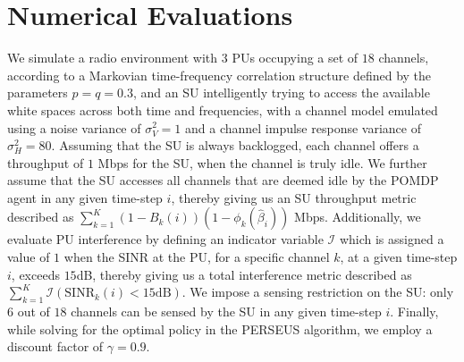 \documentclass[10pt,twocolumn]{IEEEtran}
\begin{document}
\section{Numerical Evaluations}\label{IV}
We simulate a radio environment with $3$ PUs occupying a set of $18$ channels, according to a Markovian time-frequency correlation structure defined by the parameters $p{=}q{=}0.3$, and an SU intelligently trying to access the available white spaces across both time and frequencies, with a channel model emulated using a noise variance of $\sigma_{V}^{2}{=}1$ and a channel impulse response variance of $\sigma_{H}^{2}{=}80$. Assuming that the SU is always backlogged, each channel offers a throughput of $1$ Mbps for the SU, when the channel is truly idle. We further assume that the SU accesses all channels that are deemed idle by the POMDP agent in any given time-step $i$, thereby giving us an SU throughput metric described as $\sum_{k=1}^{K}(1{-}B_{k}(i))(1{-}\phi_{k}(\hat{\beta}_{i}))$ Mbps. Additionally, we evaluate PU interference by defining an indicator variable $\mathcal{I}$ which is assigned a value of $1$ when the SINR at the PU, for a specific channel $k$, at a given time-step $i$, exceeds $15$dB, thereby giving us a total interference metric described as $\sum_{k=1}^{K}\mathcal{I}(\text{SINR}_{k}(i){<}15\text{dB})$. We impose a sensing restriction on the SU: only $6$ out of $18$ channels can be sensed by the SU in any given time-step $i$. Finally, while solving for the optimal policy in the PERSEUS algorithm, we employ a discount factor of $\gamma{=}0.9$.
\end{document}
